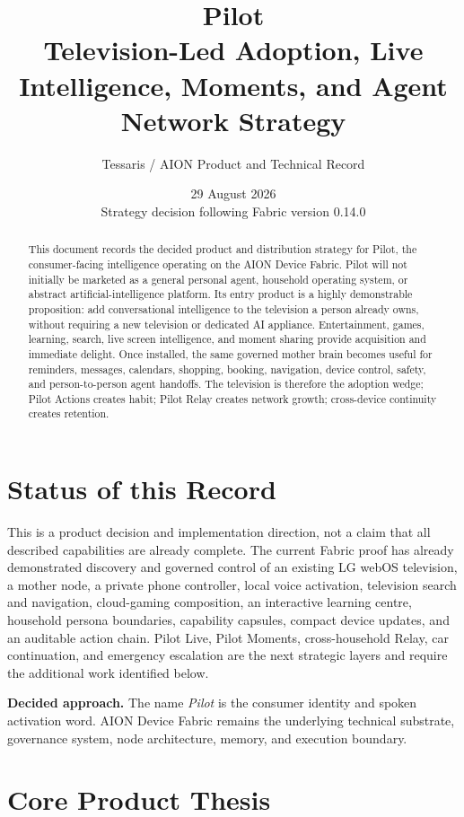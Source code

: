 \documentclass[11pt,a4paper]{article}
\title{\textbf{Pilot}\\Television-Led Adoption, Live Intelligence, Moments, and Agent Network Strategy}
\author{Tessaris / AION Product and Technical Record}
\date{29 August 2026\\Strategy decision following Fabric version 0.14.0}
\newcommand{\decision}[1]{\par\medskip\noindent\colorbox{pilotblue!9}{\parbox{0.95\linewidth}{\textbf{Decided approach.} #1}}\par\medskip}
\begin{document}
\maketitle

\begin{abstract}
This document records the decided product and distribution strategy for
Pilot, the consumer-facing intelligence operating on the AION Device Fabric.
Pilot will not initially be marketed as a general personal agent, household
operating system, or abstract artificial-intelligence platform.  Its entry
product is a highly demonstrable proposition: add conversational intelligence
to the television a person already owns, without requiring a new television or
dedicated AI appliance.  Entertainment, games, learning, search, live screen
intelligence, and moment sharing provide acquisition and immediate delight.
Once installed, the same governed mother brain becomes useful for reminders,
messages, calendars, shopping, booking, navigation, device control, safety,
and person-to-person agent handoffs.  The television is therefore the
adoption wedge; Pilot Actions creates habit; Pilot Relay creates network
growth; cross-device continuity creates retention.
\end{abstract}

\section{Status of this Record}

This is a product decision and implementation direction, not a claim that all
described capabilities are already complete.  The current Fabric proof has
already demonstrated discovery and governed control of an existing LG webOS
television, a mother node, a private phone controller, local voice activation,
television search and navigation, cloud-gaming composition, an interactive
learning centre, household persona boundaries, capability capsules, compact
device updates, and an auditable action chain.  Pilot Live, Pilot Moments,
cross-household Relay, car continuation, and emergency escalation are the next
strategic layers and require the additional work identified below.

\decision{The name \emph{Pilot} is the consumer identity and spoken activation
word.  AION Device Fabric remains the underlying technical substrate,
governance system, node architecture, memory, and execution boundary.}

\section{Core Product Thesis}
\end{document}
